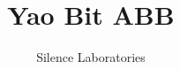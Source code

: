 \documentclass{article}
\begin{document}
\title{Yao Bit ABB}
\author{Silence Laboratories}
\maketitle





\end{document}
